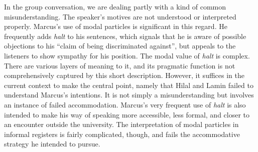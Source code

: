 \documentclass[output=paper,colorlinks,citecolor=brown]{langscibook}
\begin{document}
In the group conversation, we are dealing partly with a kind of common misunderstanding. The speaker's motives are not understood or interpreted properly. Marcus's use of modal particles is significant in this regard. He frequently adds \textit{halt} to his sentences, which signals that he is aware of possible objections to his ``claim of being discriminated against'', but appeals to the listeners to show sympathy for his position. The modal value of \textit{halt} is complex. There are various layers of meaning to it, and its pragmatic function is not comprehensively captured by this short description. However, it suffices in the current context to make the central point, namely that Hilal and Lamin failed to understand Marcus's intentions. It is not simply a misunderstanding but involves an instance of failed accommodation. Marcus's very frequent use of \textit{halt} is also intended to make his way of speaking more accessible, less formal, and closer to an encounter outside the university. The interpretation of modal particles in informal registers is fairly complicated, though, and fails the accommodative strategy he intended to pursue.
\end{document}
